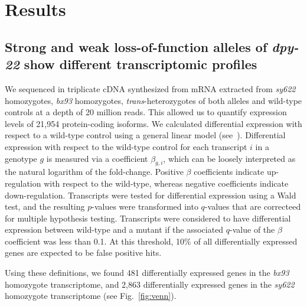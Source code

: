 \documentclass[10pt, twocolumn]{article}
\newcommand{\gene}[1]{\mbox{\emph{#1}}}
\newcommand{\dpy}{\gene{mdt-12}}
\newcommand{\strongn}{2,863}
\newcommand{\weakn}{481}
\begin{document}
\section*{Results}

\subsection*{Strong and weak loss-of-function alleles of \gene{dpy-22} show
             different transcriptomic profiles}

We sequenced in triplicate cDNA synthesized from mRNA extracted from
\emph{sy622} homozygotes, \emph{bx93} homozygotes,
\emph{trans}-heterozygotes of both alleles and wild-type controls at a depth of
20 million reads. This allowed us to quantify expression levels of
21,954 protein-coding isoforms. We calculated differential expression with
respect to a wild-type control using a general linear model
(see~). Differential expression with respect to the
wild-type control for each transcript $i$ in a genotype $g$ is measured via a
coefficient $\beta_{g, i}$, which can be loosely interpreted as the natural
logarithm of the fold-change. Positive $\beta$ coefficients indicate
up-regulation with respect to the wild-type, whereas negative coefficients
indicate down-regulation. Transcripts were tested for differential expression
using a Wald test, and the resulting $p$-values were transformed into $q$-values
that are correcteed for multiple hypothesis testing. Transcripts were considered
to have differential expression between wild-type and a mutant if the associated
$q$-value of the $\beta$ coefficient was less than 0.1. At this threshold, 10\%
of all differentially expressed genes are expected to be false positive hits.

Using these definitions, we found \weakn{} differentially expressed
genes in the  \emph{bx93} homozygote transcriptome, and \strongn{}
differentially expressed genes in the \emph{sy622} homozygote transcriptome
(see Fig.~\ref{fig:venn}).
\end{document}
